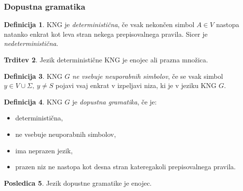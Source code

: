 \documentclass{beamer}
\theoremstyle{definition}
\newtheorem{definicija}{Definicija}[section]
\newtheorem{trditev}[definicija]{Trditev}
\newtheorem{posledica}[definicija]{Posledica}
\begin{document}
\begin{frame}
    \frametitle{Dopustna gramatika}
    \begin{definicija}
        KNG je \emph{deterministična}, če vsak nekončen simbol $A \in V$ nastopa natanko enkrat
        kot leva stran nekega prepisovalnega pravila. Sicer je 
        \emph{nedeterministična}.
    \end{definicija}
    \pause
    \begin{trditev}
        Jezik deterministične KNG je enojec ali prazna množica.
    \end{trditev}
\end{frame}

\begin{frame}
    \begin{definicija}
        KNG $G$ \emph{ne vsebuje neuporabnih simbolov}, 
        če se vsak simbol $ y \in V \cup \Sigma, \ y \neq S $ pojavi vsaj enkrat v izpeljavi 
        niza, ki je v jeziku KNG $G$.
    \end{definicija}
\end{frame}


\begin{frame}
    \begin{definicija}
        KNG $G$ je \emph{dopustna gramatika}, če je:
        \begin{itemize}
            \item deterministična,
            \item ne vsebuje neuporabnih simbolov,
            \item ima neprazen jezik,
            \item prazen niz ne nastopa kot desna stran kateregakoli prepisovalnega 
            pravila.
        \end{itemize}
    \end{definicija}
    \pause
    \begin{posledica}
        Jezik dopustne gramatike je enojec. 
    \end{posledica}
\end{frame}
\end{document}
